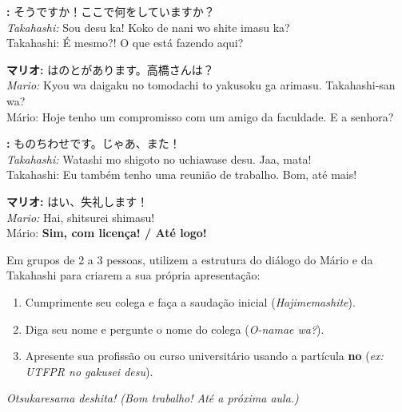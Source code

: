 \documentclass[12pt,a4paper]{article}
\newcommand{\lacuna}[1]{\textbf{#1}}
\begin{document}
\vspace{0.5em}

\textbf{:} そうですか！ここで何をして​​いますか？\\
\textit{Takahashi:} Sou desu ka! Koko de nani wo shite imasu ka?\\
Takahashi: É mesmo?! O que está fazendo aqui?

\vspace{0.5em}

\textbf{マリオ:} はのとがあります。高橋さんは？\\
\textit{Mario:} Kyou wa daigaku no tomodachi to yakusoku ga arimasu. Takahashi-san wa?\\
Mário: Hoje tenho um compromisso com um amigo da faculdade. E a senhora?

\vspace{0.5em}

\textbf{:} ものちわせです。じゃあ、また！\\
\textit{Takahashi:} Watashi mo shigoto no uchiawase desu. Jaa, mata!\\
Takahashi: Eu também tenho uma reunião de trabalho. Bom, até mais!

\vspace{0.5em}

\textbf{マリオ:} はい、失礼します！\\
\textit{Mario:} Hai, shitsurei shimasu!\\
Mário: \lacuna{Sim, com licença! / Até logo!}

\newpage

\begin{tcolorbox}[colback=jppurple!6, colframe=jppurple, title=\textbf{Dinâmica em Grupo}, fonttitle=\bfseries]
\small
Em grupos de 2 a 3 pessoas, utilizem a estrutura do diálogo do Mário e da Takahashi para criarem a sua própria apresentação:
\begin{enumerate}[leftmargin=*]
    \item Cumprimente seu colega e faça a saudação inicial (\textit{Hajimemashite}).
    \item Diga seu nome e pergunte o nome do colega (\textit{O-namae wa?}).
    \item Apresente sua profissão ou curso universitário usando a partícula \textbf{no} (\textit{ex: UTFPR no gakusei desu}).
\end{enumerate}
\end{tcolorbox}

\begin{center}
    \small\color{gray} \textit{Otsukaresama deshita! (Bom trabalho! Até a próxima aula.)}
\end{center}
\end{document}
